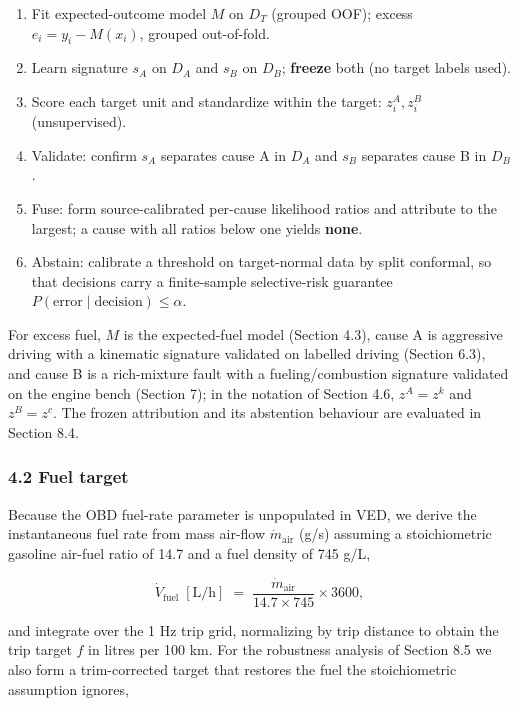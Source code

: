 \begin{enumerate}

\item
  Fit expected-outcome model \(M\) on \(D_T\) (grouped OOF); excess
  \(e_i = y_i - M(x_i)\), grouped out-of-fold.
\item
  Learn signature \(s_A\) on \(D_A\) and \(s_B\) on \(D_B\);
  \textbf{freeze} both (no target labels used).
\item
  Score each target unit and standardize within the target:
  \(z^A_i, z^B_i\) (unsupervised).
\item
  Validate: confirm \(s_A\) separates cause A in \(D_A\) and \(s_B\)
  separates cause B in \(D_B\).
\item
  Fuse: form source-calibrated per-cause likelihood ratios and attribute
  to the largest; a cause with all ratios below one yields
  \textbf{none}.
\item
  Abstain: calibrate a threshold on target-normal data by split
  conformal, so that decisions carry a finite-sample selective-risk
  guarantee \(P(\text{error}\mid\text{decision}) \le \alpha\).
\end{enumerate}

For excess fuel, \(M\) is the expected-fuel model (Section 4.3), cause A
is aggressive driving with a kinematic signature validated on labelled
driving (Section 6.3), and cause B is a rich-mixture fault with a
fueling/combustion signature validated on the engine bench (Section 7);
in the notation of Section 4.6, \(z^A = z^k\) and \(z^B = z^c\). The
frozen attribution and its abstention behaviour are evaluated in Section
8.4.

\subsubsection{4.2 Fuel target}\label{fuel-target}

Because the OBD fuel-rate parameter is unpopulated in VED, we derive the
instantaneous fuel rate from mass air-flow \(\dot m_{\text{air}}\) (g/s)
assuming a stoichiometric gasoline air-fuel ratio of 14.7 and a fuel
density of 745 g/L,

\begin{equation} \dot V_{\text{fuel}}\;[\text{L/h}] \;=\; \frac{\dot m_{\text{air}}}{14.7 \times 745}\times 3600, \end{equation}

and integrate over the 1 Hz trip grid, normalizing by trip distance to
obtain the trip target \(f\) in litres per 100 km. For the robustness
analysis of Section 8.5 we also form a trim-corrected target that
restores the fuel the stoichiometric assumption ignores,

